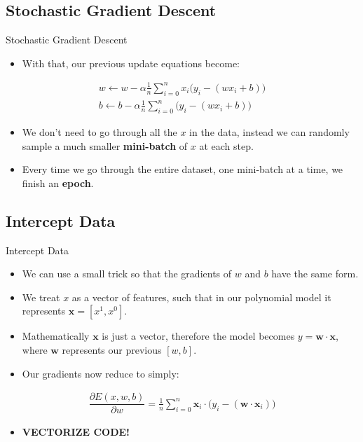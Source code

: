 \subsection{Stochastic Gradient Descent}
\begin{frame}{Stochastic Gradient Descent}
	\begin{itemize}
		\item With that, our previous update equations become:
	\end{itemize}
	\begin{gather*}
	w \leftarrow w - \alpha \frac{1}{n}\sum_{i = 0}^n x_i \Big(y_i - (wx_i + b)\Big)\\
	b \leftarrow b - \alpha \frac{1}{n}\sum_{i = 0}^n \Big(y_i - (wx_i + b)\Big)
	\end{gather*}
	\begin{itemize}
		\item We don't need to go through all the $x$ in the data, instead we can randomly sample a much smaller \textbf{mini-batch} of $x$ at each step.
		\item Every time we go through the entire dataset, one mini-batch at a time, we finish an \textbf{epoch}.
	\end{itemize}
\end{frame}


\subsection{Intercept Data}
\begin{frame}{Intercept Data}
	\begin{itemize}
		\item We can use a small trick so that the gradients of $w$ and $b$ have the same form.
		\item We treat $x$ as a vector of features, such that in our polynomial model it represents $\boldsymbol{x} = [x^1, x^0]$.
		\item Mathematically $\boldsymbol{x}$ is just a vector, therefore the model becomes $y = \boldsymbol{w}\cdot\boldsymbol{x}$, where $\boldsymbol{w}$ represents our previous $[w, b]$.
		\item Our gradients now reduce to simply:
	\end{itemize}
	\begin{gather*}
	\dfrac{\partial E(x,w,b)}{\partial w} = \frac{1}{n}\sum_{i = 0}^n \boldsymbol{x}_i \cdot \Big(y_i - (\boldsymbol{w} \cdot \boldsymbol{x}_i)\Big)
	\end{gather*}
	\begin{itemize}
		\item \textbf{VECTORIZE CODE!}
	\end{itemize}
\end{frame}


